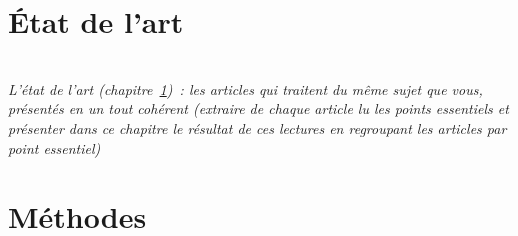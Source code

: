 \documentclass[a4paper,11pt,twoside]{memoir}
\begin{document}


\chapter{\'Etat de l'art}
\label{chap:articles}

\adjustmtc
\minitoc

\textit{\\L’état de l'art (chapitre~\ref{chap:articles})~: les articles
qui traitent du même sujet que vous, présentés en un tout cohérent
\emph{(extraire de chaque article lu les points essentiels et
	présenter dans ce chapitre le résultat de ces lectures en
	regroupant les articles par point essentiel)}}

%
%




\chapter{Méthodes}
\label{chap:methodes}
\minitoc
\end{document}
